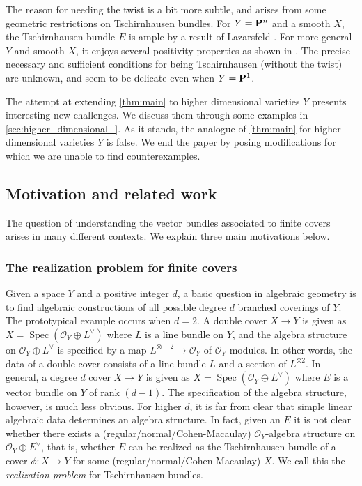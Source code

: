 \documentclass[11 pt]{amsart}
\renewcommand{\O}{{\mathcal O}}
\renewcommand {\P}{{\bf P}}
\providecommand {\from}{{\colon}}
\providecommand{\spec}{\operatorname{Spec}}
\numberwithin{equation}{section}
\begin{document}
The reason for needing the twist is a bit more subtle, and arises from some geometric restrictions on Tschirnhausen bundles.
For $Y = \P^n$ and a smooth $X$, the Tschirnhausen bundle $E$ is ample by a result of Lazarsfeld \cite{laz:80}.
For more general $Y$ and smooth $X$, it enjoys several positivity properties as shown in \cite{pet.som:00,pet.som:04}.
The precise necessary and sufficient conditions for being Tschirnhausen (without the twist) are unknown, and seem to be delicate even when $Y = \P^1$.

The attempt at extending \autoref{thm:main} to higher dimensional varieties $Y$ presents interesting new challenges.
We discuss them through some examples in \autoref{sec:higher_dimensional_}.
As it stands, the analogue of \autoref{thm:main} for higher dimensional varieties $Y$ is false.
We end the paper by posing modifications for which we are unable to find counterexamples.

\subsection{Motivation and related work}
The question of understanding the vector bundles associated to finite covers arises in many different contexts.
We explain three main motivations below.
\subsubsection{The realization problem for finite covers}
Given a space $Y$ and a positive integer $d$, a basic question in algebraic geometry is to find algebraic constructions of all possible degree $d$ branched coverings of $Y$.
The prototypical example occurs when $d = 2$.
A double cover $X \to Y$ is given as $X = \spec(\O_Y \oplus L^\vee)$ where $L$ is a line bundle on $Y$, and the algebra structure on $\O_Y \oplus L^\vee$ is specified by a map $L^{\otimes -2} \to \O_Y$ of $\O_Y$-modules.
In other words, the data of a double cover consists of a line bundle $L$ and a section of $L^{\otimes 2}$.
In general, a degree $d$ cover $X \to Y$ is given as $X = \spec (\O_Y \oplus E^\vee)$ where $E$ is a vector bundle on $Y$ of rank $(d-1)$.
The specification of the algebra structure, however, is much less obvious.
For higher $d$, it is far from clear that simple linear algebraic data determines an algebra structure.
In fact, given an $E$ it is not clear whether there exists a (regular/normal/Cohen-Macaulay) $\O_Y$-algebra structure on $\O_Y \oplus E^\vee$, that is, whether $E$ can be realized as the Tschirnhausen bundle of a cover $\phi \from X \to Y$  for some (regular/normal/Cohen-Macaulay) $X$.
We call this the \emph{realization problem} for Tschirnhausen bundles.
\end{document}
